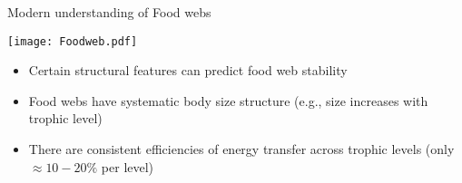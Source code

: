 \begin{frame}{Modern understanding of Food webs}

  \begin{center}
    \texttt{[image: Foodweb.pdf]}
  \end{center} 
  \vspace{-6pt}
  \begin{itemize}[<+->] \itemsep0pt
    \item Certain structural features can predict  food web stability\footnotemark[1]
    \item Food webs have systematic body size structure (e.g., size increases with trophic level)\footnotemark[2]
    \item There are consistent efficiencies of energy transfer across trophic levels (only $\approx 10-20\%$ per level)
 \end{itemize} 

 
\end{frame}

